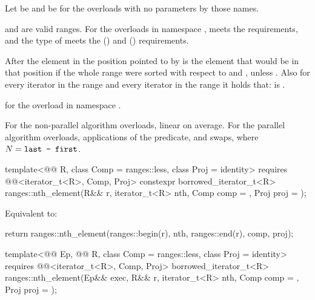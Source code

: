 \begin{itemdescr}
\pnum
Let  be 
and  be 
for the overloads with no parameters by those names.

\pnum
\expects
{} and  are valid ranges.
For the overloads in namespace ,
 meets
the  requirements, and
the type of  meets
the  () and
 () requirements.

\pnum
\effects
After  the element in the position pointed to by 
is the element that would be in that position
if the whole range were sorted with respect to  and ,
unless .
Also for every iterator  in the range 
and every iterator  in the range 
it holds that:
 is .

\pnum
\returns
{} for the overload in namespace .

\pnum
\complexity
For the non-parallel algorithm overloads, linear on average.
For the parallel algorithm overloads,  applications of
the predicate, and  swaps, where $N = \tcode{last - first}$.
\end{itemdescr}

\begin{itemdecl}
template<@@ R, class Comp = ranges::less, class Proj = identity>
  requires @@<iterator_t<R>, Comp, Proj>
  constexpr borrowed_iterator_t<R>
    ranges::nth_element(R&& r, iterator_t<R> nth, Comp comp = {}, Proj proj = {});
\end{itemdecl}

\begin{itemdescr}
\pnum
\effects
Equivalent to:
\begin{codeblock}
return ranges::nth_element(ranges::begin(r), nth, ranges::end(r), comp, proj);
\end{codeblock}
\end{itemdescr}

\begin{itemdecl}
template<@@ Ep, @@ R, class Comp = ranges::less,
         class Proj = identity>
  requires @@<iterator_t<R>, Comp, Proj>
  borrowed_iterator_t<R>
    ranges::nth_element(Ep&& exec, R&& r, iterator_t<R> nth, Comp comp = {}, Proj proj = {});
\end{itemdecl}

